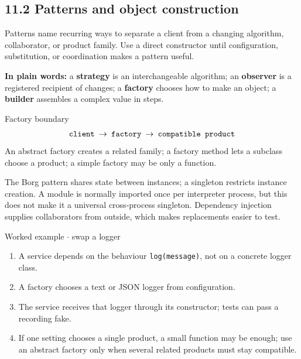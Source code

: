 \documentclass[11pt]{article}
\begin{document}
\begin{keepsection}
\section{11.2 Patterns and object construction}

Patterns name recurring ways to separate a client from a changing algorithm, collaborator, or product family. Use a direct constructor until configuration, substitution, or coordination makes a pattern useful.

\begin{plainbox}\textbf{In plain words:} a \textbf{strategy} is an interchangeable algorithm; an \textbf{observer} is a registered recipient of changes; a \textbf{factory} chooses how to make an object; a \textbf{builder} assembles a complex value in steps.\end{plainbox}

\begin{equationcard}{Factory boundary}
\[ \begin{gathered} \texttt{client \ensuremath{\to} factory \ensuremath{\to} compatible product} \end{gathered} \]
{\small An abstract factory creates a related family; a factory method lets a subclass choose a product; a simple factory may be only a function.}
\end{equationcard}

The Borg pattern shares state between instances; a singleton restricts instance creation. A module is normally imported once per interpreter process, but this does not make it a universal cross-process singleton. Dependency injection supplies collaborators from outside, which makes replacements easier to test.

\begin{workedbox}{Worked example \ensuremath{\cdot} swap a logger}
\begin{enumerate}
\item A service depends on the behaviour \texttt{log(message)}, not on a concrete logger class.
\item A factory chooses a text or JSON logger from configuration.
\item The service receives that logger through its constructor; tests can pass a recording fake.
\item If one setting chooses a single product, a small function may be enough; use an abstract factory only when several related products must stay compatible.
\end{enumerate}
\end{workedbox}


\end{keepsection}
\end{document}
